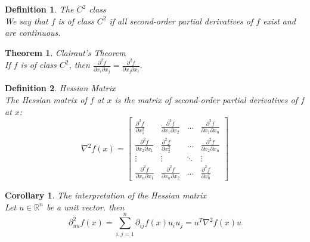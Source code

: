 \documentclass[11pt]{book} %
\newtheorem{theorem}{Theorem}[section]
\newtheorem{definition}{Definition}[section]
\newtheorem*{corollary*}{Corollary}
\begin{document}
\bigbreak

\begin{definition}\label{def:C^2_class}{The $C^2$ class} \\
We say that $f$ is of class $C^2$ if all second-order partial derivatives of $f$ exist and are continuous.
\end{definition}

\bigbreak

\begin{theorem}{Clairaut's Theorem} \\
If $f$ is of class $C^2$, then $\frac{\partial^2 f}{\partial x_i \partial x_j} = \frac{\partial^2 f}{\partial x_j \partial x_i}$.
\end{theorem}

\bigbreak

\begin{definition}{Hessian Matrix} \\
The Hessian matrix of $f$ at $x$ is the matrix of second-order partial derivatives of $f$ at $x$:
\begin{equation}
    \nabla^2 f(x) = \begin{bmatrix}
    \frac{\partial^2 f}{\partial x_1^2} & \frac{\partial^2 f}{\partial x_1 \partial x_2} & \ldots & \frac{\partial^2 f}{\partial x_1 \partial x_n} \\
    \frac{\partial^2 f}{\partial x_2 \partial x_1} & \frac{\partial^2 f}{\partial x_2^2} & \ldots & \frac{\partial^2 f}{\partial x_2 \partial x_n} \\
    \vdots & \vdots & \ddots & \vdots \\
    \frac{\partial^2 f}{\partial x_n \partial x_1} & \frac{\partial^2 f}{\partial x_n \partial x_2} & \ldots & \frac{\partial^2 f}{\partial x_n^2}
    \end{bmatrix}
\end{equation}
\end{definition}

\bigbreak

\begin{corollary*}{The interpretation of the Hessian matrix} \\
Let $u \in \mathbb{R}^n$ be a unit vector. then
\begin{equation}
    \partial_{uu}^2 f(x) = \sum_{i,j=1}^n \partial_{ij} f(x) u_i u_j  = u^T \nabla^2 f(x) u
\end{equation}
\end{corollary*}

\bigbreak
\end{document}
